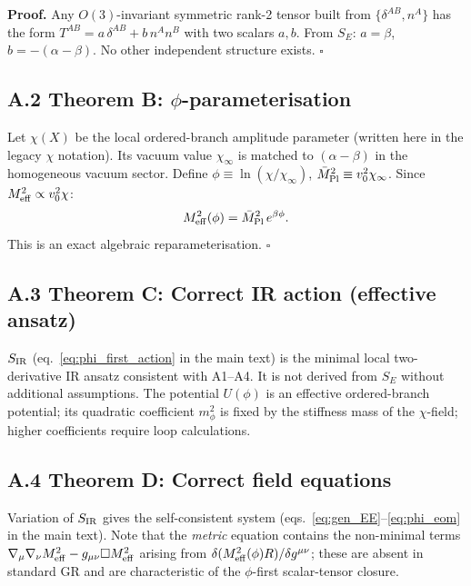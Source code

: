 \documentclass[11pt,a4paper]{article}
\numberwithin{equation}{section}
\begin{document}
\textbf{Proof.}
Any $O(3)$-invariant symmetric rank-2 tensor built from
$\{\delta^{AB}, n^A\}$ has the form $T^{AB}=a\,\delta^{AB}+b\,n^An^B$
with two scalars $a,b$. From $S_E$: $a=\beta$, $b=-(\alpha{-}\beta)$.
No other independent structure exists. $\square$

\subsection*{A.2 Theorem B: $\phi$-parameterisation}

Let $\chi(X)$ be the local ordered-branch amplitude parameter
(written here in the legacy $\chi$ notation).
Its vacuum value $\chi_\infty$ is matched to
$(\alpha{-}\beta)$ in the homogeneous vacuum sector.
Define $\phi\equiv\ln(\chi/\chi_\infty)$,
$\bar{M}^2_{\rm Pl}\equiv v_0^2\chi_\infty$.
Since $M^2_{\rm eff}\propto v_0^2\chi$:
\begin{equation}
  M^2_{\rm eff}(\phi) = \bar{M}^2_{\rm Pl}\,e^{\beta\phi}.
\end{equation}
This is an exact algebraic reparameterisation. $\square$

\subsection*{A.3 Theorem C: Correct IR action (effective ansatz)}

$S_{\rm IR}$ (eq.~\eqref{eq:phi_first_action} in the main text) is the minimal
local two-derivative IR ansatz consistent with A1--A4.
It is not derived from $S_E$ without additional assumptions.
The potential $U(\phi)$ is an effective ordered-branch potential;
its quadratic coefficient $m_\phi^2$ is fixed by the stiffness mass
of the $\chi$-field; higher coefficients require loop calculations.

\subsection*{A.4 Theorem D: Correct field equations}

Variation of $S_{\rm IR}$ gives the self-consistent system
(eqs.~\eqref{eq:gen_EE}--\eqref{eq:phi_eom} in the main text).
Note that the \emph{metric} equation contains the non-minimal terms
$\nabla_\mu\nabla_\nu M^2_{\rm eff} - g_{\mu\nu}\Box M^2_{\rm eff}$
arising from $\delta(M^2_{\rm eff}(\phi)R)/\delta g^{\mu\nu}$;
these are absent in standard GR and are characteristic of the
$\phi$-first scalar-tensor closure.
\end{document}
